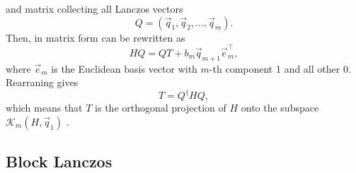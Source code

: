 and matrix collecting all Lanczos vectors
\begin{equation}
    Q = (\vec{q}_1, \vec{q}_2, \ldots, \vec{q}_m).
\end{equation}
Then,  in matrix form can be rewritten as
\begin{equation}
    H Q = Q T + b_{m}\vec{q}_{m+1}\vec{e}_{m}^\top,
\end{equation}
where $\vec{e}_m$ is the Euclidean basis vector with $m$-th component 1 and all other 0.
Rearraning gives
\begin{equation}
    T = Q^\dag H Q,
\end{equation}
which means that $T$ is the orthogonal projection of $H$ onto
the subspace $\mathcal{K}_m(H, \vec{q}_1)$ \cite{Cullum1985}.

\subsection{Block Lanczos}

